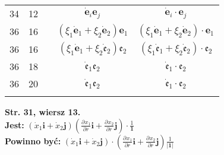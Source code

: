 \documentclass[a4paper,11pt]{article}
\newcommand{\tb}{\textbf}
\newcommand{\noi}{\noindent}
\newcommand{\tb}{\textbf}
\newcommand{\noi}{\noindent}
\newcommand{\StrWg}[2]{\tb{Str. #1, wiersz #2.}}
\newcommand{\Jest}{\tb{Jest: }}
\newcommand{\Pow}{\tb{Powinno być: }}
\newcommand{\fr}{\frac}
\newcommand{\mf}{\mathfrak}
\newcommand{\pr}{\partial}
\newcommand{\pd}[3]{\fr{ \pr^{ #1 } { #2 } }{ \pr { #3 }^{ #1 } }}
\newcommand{\Jest}{\tb{Jest: }}
\newcommand{\Pow}{\tb{Powinno być: }}
\newcommand{\fr}{\frac}
\newcommand{\mf}{\mathfrak}
\newcommand{\pr}{\partial}
\newcommand{\pd}[3]{\fr{ \pr^{ #1 } { #2 } }{ \pr { #3 }^{ #1 } }}
\newcommand{\tb}{\textbf}
\newcommand{\noi}{\noindent}
\newcommand{\StrWg}[2]{\tb{Str. #1, wiersz #2.}}
\newcommand{\Jest}{\tb{Jest: }}
\newcommand{\Pow}{\tb{Powinno być: }}
\newcommand{\bd}[1]{\boldsymbol{#1}}
\newcommand{\ib}{\bd{i}}
\newcommand{\jb}{\bd{j}}
\newcommand{\dotx}{\dot{ x }}
\begin{document}
\begin{center}
\begin{tabular}{|c|c|c|c|c|}
    34 & 12 & & $\dot{ \mathbf{ e } }_{ i } \mathbf{ e }_{ j }$
           & $\dot{ \mathbf{ e } }_{ i } \cdot \mathbf{ e }_{ j }$ \\
    36 & 16 & & $( \xi_{ 1 } \dot{ \mathbf{ e } }_{ 1 } + \xi_{ 2 }
                \dot{ \mathbf{ e } }_{ 2 }  ) \mathbf{ e }_{ 1 }$
           & $( \xi_{ 1 } \dot{ \mathbf{ e } }_{ 1 } + \xi_{ 2 }
             \dot{ \mathbf{ e } }_{ 2 }  ) \cdot \mathbf{ e }_{ 1 }$ \\
    36 & 16 & & $( \xi_{ 1 } \dot{ \mathbf{ e } }_{ 1 } + \xi_{ 2 }
                \dot{ \mf{ e } }_{ 2 }  ) \mf{ e }_{ 2 }$
           & $( \xi_{ 1 } \dot{ \mf{ e } }_{ 1 } + \xi_{ 2 }
             \dot{ \mf{ e } }_{ 2 }  ) \cdot \mf{ e }_{ 2 }$ \\
    36 & 18 & & $\dot{ \mf{ e } }_{ 1 } \mf{ e }_{ 2 }$
           & $\dot{ \mf{ e } }_{ 1 } \cdot \mf{ e }_{ 2 }$ \\
    36 & 20 & & $\dot{ \mf{ e } }_{ 1 } \mf{ e }_{ 2 }$
           & $\dot{ \mf{ e } }_{ 1 } \cdot \mf{ e }_{ 2 }$ \\
    & & & & \\ \hline
  \end{tabular}
\end{center}
\noi
\StrWg{31}{13} \\
\Jest $( \dotx_{ 1 } \ib + \dotx_{ 2 } \jb )
\left( \pd{}{ x_{ 1 } }{ r } \ib + \pd{}{ x_{ 2 } }{ r } \jb \right)
\cdot \fr{ 1 }{ \bd{ 1 } }$ \\
\Pow $( \dotx_{ 1 } \ib + \dotx_{ 2 } \jb )
\cdot \left( \pd{}{ x_{ 1 } }{ r } \ib + \pd{}{ x_{ 2 } }{ r } \jb \right)
\fr{ 1 }{ | \bd{ 1 } | }$ \\





 {}
\end{document}
